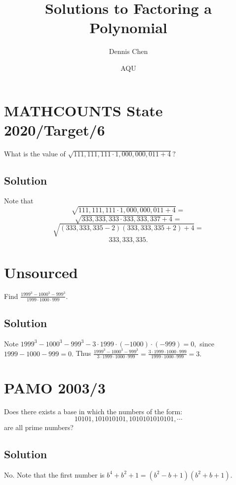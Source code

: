 \documentclass{article}
\title{Solutions to Factoring a Polynomial}
\author{Dennis Chen}
\date{AQU}
\begin{document}
\maketitle

{\hypersetup{
    citecolor=black,
    filecolor=black,
    linkcolor=black,
    urlcolor=black}\tableofcontents
}

\pagebreak\section{MATHCOUNTS State 2020/Target/6}

What is the value of $\sqrt{111,111,111\cdot 1,000,000,011+4}?$

\subsection{Solution}

Note that
\[\sqrt{111,111,111\cdot 1,000,000,011+4}=\]
\[\sqrt{333,333,333\cdot 333,333,337+4}=\]
\[\sqrt{(333,333,335-2)(333,333,335+2)+4}=\]
\[333,333,335.\]

\pagebreak\section{Unsourced}

Find $\frac{1999^3-1000^3-999^3}{1999\cdot 1000\cdot 999}.$

\subsection{Solution}

Note $1999^3-1000^3-999^3-3\cdot 1999\cdot (-1000)\cdot (-999)=0,$ since $1999-1000-999=0.$ Thus $\frac{1999^3-1000^3-999^3}{3\cdot 1999\cdot 1000\cdot 999}=\frac{3\cdot 1999\cdot 1000\cdot 999}{1999\cdot 1000\cdot 999}=3.$

\pagebreak\section{PAMO 2003/3}

Does there exists a base in which the numbers of the form:
\[ 10101, 101010101, 1010101010101,\cdots \]
are all prime numbers?

\subsection{Solution}
No. Note that the first number is $b^4+b^2+1=(b^2-b+1)(b^2+b+1).$
\end{document}
